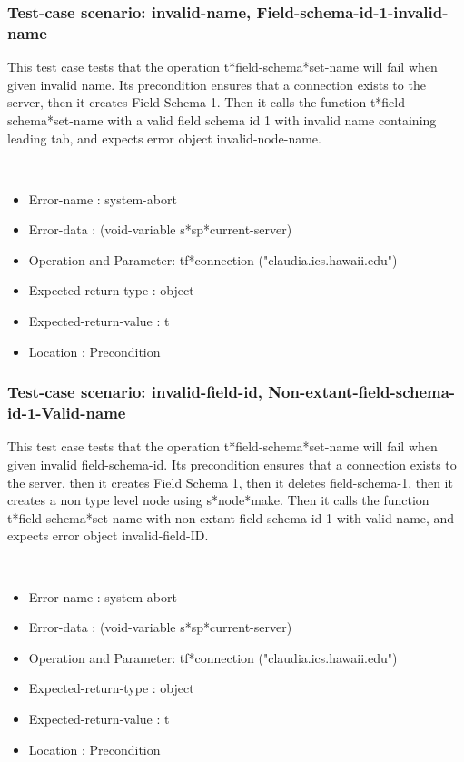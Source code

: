 \subsubsection {Test-case scenario: invalid-name, Field-schema-id-1-invalid-name}


This test case tests that the operation t*field-schema*set-name will fail when given invalid name.
Its precondition ensures that a connection exists to the server, then it creates Field Schema 1.
Then it calls the function t*field-schema*set-name  with a valid field schema id 1 with invalid name containing leading tab, and expects error object invalid-node-name.



\
\begin {itemize}
\item 	Error-name             : system-abort
\item Error-data             : (void-variable s*sp*current-server)
\item Operation and Parameter: tf*connection ("claudia.ics.hawaii.edu")
\item Expected-return-type   : object
\item Expected-return-value  : t
\item Location               : Precondition



\end {itemize}
\subsubsection {Test-case scenario: invalid-field-id, Non-extant-field-schema-id-1-Valid-name}


This test case tests that the operation t*field-schema*set-name will fail when given invalid field-schema-id.
Its precondition ensures that a connection exists to the server, then it creates Field Schema 1, then it deletes field-schema-1, then it creates a non type level node using s*node*make.
Then it calls the function t*field-schema*set-name  with non extant field schema id 1 with valid name, and expects error object invalid-field-ID.



\
\begin {itemize}
\item 	Error-name             : system-abort
\item Error-data             : (void-variable s*sp*current-server)
\item Operation and Parameter: tf*connection ("claudia.ics.hawaii.edu")
\item Expected-return-type   : object
\item Expected-return-value  : t
\item Location               : Precondition



\end {itemize}
